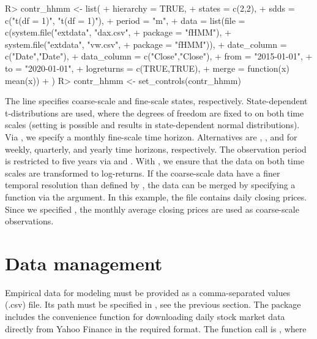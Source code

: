 \documentclass[article]{jss}
\newcommand{\fct}[1]{\code{#1()}}
\begin{document}
%
\begin{Schunk}
\begin{Sinput}
R> contr_hhmm <- list(
+    hierarchy = TRUE,
+    states    = c(2,2),
+    sdds      = c("t(df = 1)", "t(df = 1)"),
+    period    = "m",
+    data      = list(file = c(system.file("extdata", "dax.csv", 
+                              package = "fHMM"),
+                              system.file("extdata", "vw.csv", 
+                              package = "fHMM")),
+                     date_column = c("Date","Date"),
+                     data_column = c("Close","Close"),
+                     from = "2015-01-01",
+                     to = "2020-01-01",
+                     logreturns = c(TRUE,TRUE),
+                     merge = function(x) mean(x))
+  )
R> contr_hhmm <- set_controls(contr_hhmm)
\end{Sinput}
\end{Schunk}
%

The line  specifies  coarse-scale and  fine-scale states, respectively. State-dependent t-distributions are used, where the degrees of freedom are fixed to  on both time scales (setting  is possible and results in state-dependent normal distributions). Via , we specify a monthly fine-scale time horizon. Alternatives are , , and  for weekly, quarterly, and yearly time horizons, respectively. The observation period is restricted to five years via  and . With , we ensure that the data on both time scales are transformed to log-returns. If the coarse-scale data have a finer temporal resolution than defined by , the data can be merged by specifying a function via the  argument. In this example, the file  contains daily closing prices. Since we specified , the monthly average closing prices are used as coarse-scale observations.

\section{Data management} \label{sec:data_management} %

Empirical data for modeling must be provided as a comma-separated values (.csv) file. Its path must be specified in \fct{set\_controls}, see the previous section. The package includes the convenience function \fct{download\_data} for downloading daily stock market data directly from Yahoo Finance in the required format. The function call is , where
\end{document}
